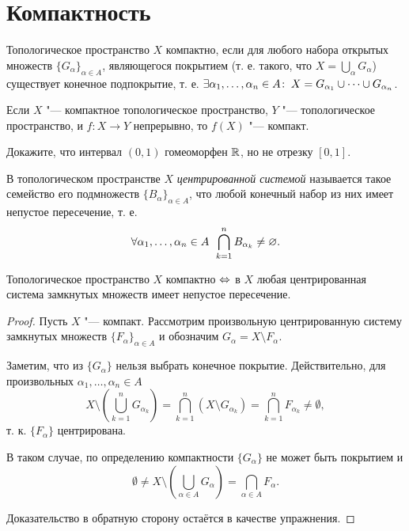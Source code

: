\documentclass[main]{subfiles}
\begin{document}
\section{Компактность}

\begin{definition}
  Топологическое пространство \( X \) компактно,
  если для любого набора открытых множеств
  \( {\{ G_\alpha \}}_{\alpha \in A} \),
  являющегося покрытием
  (т. е. такого, что \( X = \bigcup_\alpha G_\alpha \))
  существует конечное подпокрытие, т. е.
  \( \exists \alpha_1, \dots, \alpha_n \in A \colon \:
  X = G_{\alpha_1} \cup \dots \cup G_{\alpha_n} \).
\end{definition}

\begin{exercise}
  Если \( X \) "--- компактное топологическое пространство,
  \( Y \) "--- топологическое пространство,
  и \( f : X \to Y \) непрерывно,
  то \( f(X) \) "--- компакт.
\end{exercise}

\begin{exercise}
  Докажите, что интервал \( (0, 1) \) гомеоморфен \( \mathbb{R} \),
  но не отрезку \( [0, 1] \).
\end{exercise}

\begin{definition}
  В топологическом пространстве \( X \)
  \emph{центрированной системой}
  называется такое семейство его подмножеств
  \( {\{ B_\alpha \}}_{\alpha \in A} \),
  что любой конечный набор из них имеет непустое пересечение,
  т. е.
  \[
    \forall {\alpha_1, \dots, \alpha_n \in A} \; \,
    \bigcap_{k = 1}^n B_{\alpha_k} \ne \varnothing.
  \]
\end{definition}

\begin{theorem}\label{thm:compact-centered}
  Топологическое пространство \( X \) компактно
  \( \Leftrightarrow \)
  в \( X \) любая центрированная система замкнутых
  множеств имеет непустое пересечение.
\end{theorem}
\begin{proof}
  Пусть \( X \) "--- компакт. Рассмотрим
  произвольную центрированную систему замкнутых множеств
  \( {\{ F_\alpha \}}_{\alpha \in A} \) и обозначим
  \( G_\alpha = X \setminus F_\alpha \).

  Заметим, что из \( \{ G_\alpha \} \) нельзя выбрать
  конечное покрытие. Действительно, для произвольных
  \( \alpha_1, \dots, \alpha_n \in A \)
  \[
    X \setminus \left( \bigcup_{k=1}^n G_{\alpha_k} \right) =
    \bigcap_{k = 1}^n (X \setminus G_{\alpha_k}) =
    \bigcap_{k = 1}^n F_{\alpha_k} \ne \emptyset,
  \]
  т. к. \( \{ F_\alpha \} \) центрирована.

  В таком случае, по определению компактности \( \{ G_\alpha \} \)
  не может быть покрытием и
  \[
    \emptyset \ne
    X \setminus \left( \bigcup_{\alpha \in A } G_{\alpha} \right) =
    \bigcap_{\alpha \in A} F_{\alpha}.
  \]

  Доказательство в обратную сторону остаётся в качестве упражнения.
\end{proof}
\end{document}

